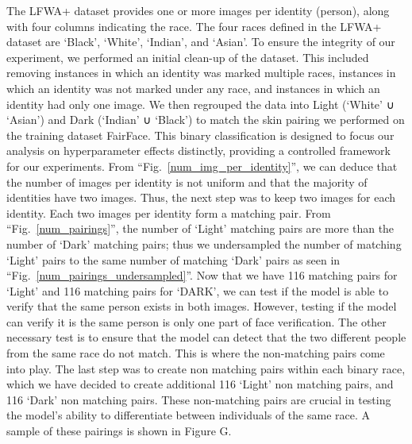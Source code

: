 \documentclass[conference]{IEEEtran}
\begin{document}
The LFWA+ dataset provides one or more images per identity (person), along with four columns indicating the race. The four races defined in the LFWA+ dataset are ‘Black’, ‘White’, ‘Indian’, and ‘Asian’. To ensure the integrity of our experiment, we performed an initial clean-up of the dataset. This included removing instances in which an identity was marked multiple races, instances in which an identity was not marked under any race, and instances in which an identity had only one image. We then regrouped the data into Light (‘White’ ∪ ‘Asian’) and Dark (‘Indian’ ∪ ‘Black’) to match the skin pairing we performed on the training dataset FairFace. This binary classification is designed to focus our analysis on hyperparameter effects distinctly, providing a controlled framework for our experiments.  From ``Fig.~\ref{num_img_per_identity}'', we can deduce that the number of images per identity is not uniform and that the majority of identities have two images. Thus, the next step was to keep two images for each identity. Each two images per identity form a matching pair. From ``Fig.~\ref{num_pairings}'', the number of ‘Light’ matching pairs are more than the number of ‘Dark’ matching pairs; thus we undersampled the number of matching ‘Light’ pairs to the same number of matching  ‘Dark’ pairs as seen in ``Fig.~\ref{num_pairings_undersampled}''.
Now that we have 116 matching pairs for ‘Light’ and 116 matching pairs for ‘DARK’, we can test if the model is able to verify that the same person exists in both images. However, testing if the model can verify it is the same person is only one part of face verification. The other necessary test is to ensure that the model can detect that the two different people from the same race do not match. This is where the non-matching pairs come into play. The last step was to create non matching pairs within each binary race, which we have decided to create additional 116 ‘Light’ non matching pairs, and 116 ‘Dark’ non matching pairs.  These non-matching pairs are crucial in testing the model's ability to differentiate between individuals of the same race. A sample of these pairings is shown in Figure G.
\end{document}
